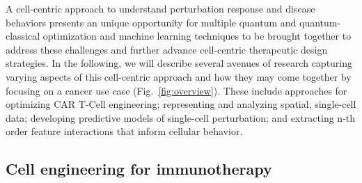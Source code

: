 \documentclass{article}
\begin{document}
A cell-centric approach to understand perturbation response and disease behaviors presents an unique opportunity for multiple quantum and quantum-classical optimization and machine learning techniques to be brought together to address these challenges and further advance cell-centric therapeutic design strategies. 
In the following, we will describe several avenues of research capturing varying aspects of this cell-centric approach and how they may come together by focusing on a cancer use case (Fig.~\ref{fig:overview}). These include approaches for optimizing CAR T-Cell engineering; representing and analyzing spatial, single-cell data; developing predictive models of single-cell perturbation; and extracting n-th order feature interactions that inform cellular behavior. 


\subsection{Cell engineering for immunotherapy}
\end{document}

